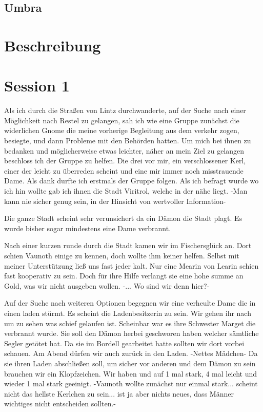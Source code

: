 \documentclass[10pt,twoside,openany]{book}
\begin{document}
	\section{Umbra}
	
	\chapter{Beschreibung}
	
	\chapter{Session 1}
	Als ich durch die Straßen von Lintz durchwanderte, auf der Suche nach einer Möglichkeit nach Restel zu gelangen, sah ich wie eine Gruppe zunächst die widerlichen Gnome die meine vorherige Begleitung aus dem verkehr zogen, besiegte, und dann Probleme mit den Behörden hatten. Um mich bei ihnen zu bedanken und möglicherweise etwas leichter, näher an mein Ziel zu gelangen beschloss ich der Gruppe zu helfen. Die drei vor mir, ein verschlossener Kerl, einer der leicht zu überreden scheint und eine mir immer noch misstrauende Dame. Als dank durfte ich erstmals der Gruppe folgen. Als ich befragt wurde wo ich hin wollte gab ich ihnen die Stadt Viritrol, welche in der nähe liegt. -Man kann nie sicher genug sein, in der Hinsicht von wertvoller Information-
	
	Die ganze Stadt scheint sehr verunsichert da ein Dämon die Stadt plagt. Es wurde bisher sogar mindestens eine Dame verbrannt. 
	
	Nach einer kurzen runde durch die Stadt kamen wir im Fischersglück an. Dort schien Vaunoth einige zu kennen, doch wollte ihm keiner helfen. Selbst mit meiner Unterstützung ließ uns fast jeder kalt. Nur eine Mearin von Learin schien fast kooperativ zu sein. Doch für ihre Hilfe verlangt sie eine hohe summe an Gold, was wir nicht ausgeben wollen. -... Wo sind wir denn hier?-
	
	Auf der Suche nach weiteren Optionen begegnen wir eine verheulte Dame die in einen laden stürmt. Es scheint die Ladenbesitzerin zu sein. Wir gehen ihr nach um zu sehen was schief gelaufen ist. Scheinbar war es ihre Schwester Marget die verbrannt wurde. Sie soll den Dämon herbei geschworen haben welcher sämtliche Segler getötet hat. Da sie im Bordell gearbeitet hatte sollten wir dort vorbei schauen. Am Abend dürfen wir auch zurück in den Laden. -Nettes Mädchen- Da sie ihren Laden abschließen soll, um sicher vor anderen und dem Dämon zu sein brauchen wir ein Klopfzeichen. Wir haben und auf 1 mal stark, 4 mal leicht und wieder 1 mal stark geeinigt. -Vaunoth wollte zunächst nur einmal stark... scheint nicht das hellste Kerlchen zu sein... ist ja aber nichts neues, dass Männer wichtiges nicht entscheiden sollten.- 
	
\end{document}
